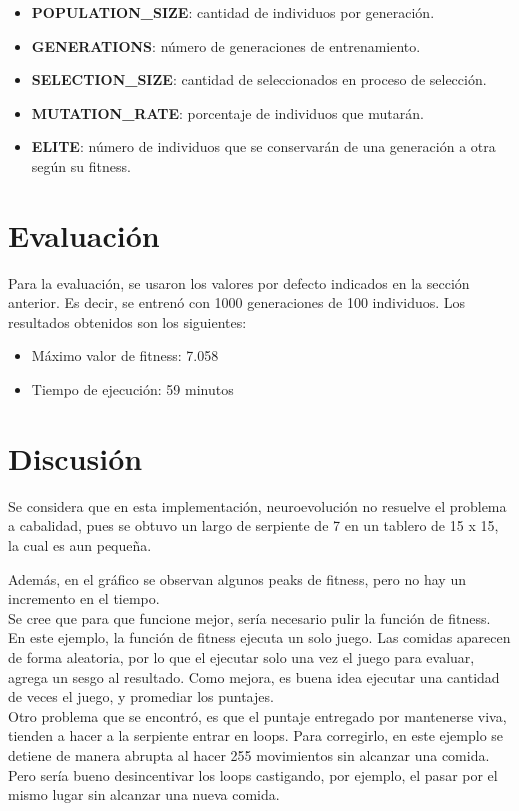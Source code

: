 \documentclass[letterpaper,11pt]{article} %
\begin{document}
\begin{itemize}
\item \textbf{POPULATION\_SIZE}: cantidad de individuos por generación.
\item \textbf{GENERATIONS}: número de generaciones de entrenamiento.
\item \textbf{SELECTION\_SIZE}: cantidad de seleccionados en proceso de selección.
\item \textbf{MUTATION\_RATE}: porcentaje de individuos que mutarán.
\item \textbf{ELITE}: número de individuos que se conservarán de una generación a otra según su fitness.
\end{itemize}

\section{Evaluación}

Para la evaluación, se usaron los valores por defecto indicados en la sección anterior. Es decir, se entrenó con 1000 generaciones de 100 individuos. Los resultados obtenidos son los siguientes:

\begin{itemize}
\item Máximo valor de fitness: 7.058
\item Tiempo de ejecución: 59 minutos
\end{itemize}



\section{Discusión}

Se considera que en esta implementación, neuroevolución no resuelve el problema a cabalidad, pues se obtuvo un largo de serpiente de 7 en un tablero de 15 x 15, la cual es aun pequeña.


Además, en el gráfico se observan algunos peaks de fitness, pero no hay un incremento en el tiempo.\\

Se cree que para que funcione mejor, sería necesario pulir la función de fitness. \\

En este ejemplo, la función de fitness ejecuta un solo juego. Las comidas aparecen de forma aleatoria, por lo que el ejecutar solo una vez el juego para evaluar, agrega un sesgo al resultado. Como mejora, es buena idea ejecutar una cantidad de veces el juego, y promediar los puntajes.\\

Otro problema que se encontró, es que el puntaje entregado por mantenerse viva, tienden a hacer a la serpiente entrar en loops. Para corregirlo, en este ejemplo se detiene de manera abrupta al hacer 255 movimientos sin alcanzar una comida. Pero sería bueno desincentivar los loops castigando, por ejemplo, el pasar por el mismo lugar sin alcanzar una nueva comida.
\end{document}
